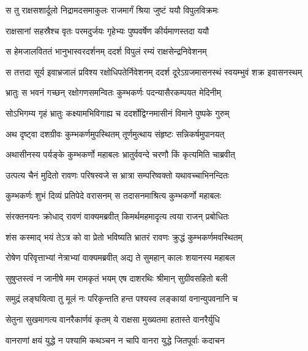 
\twolineshloka
{स तु राक्षसशार्दूलो निद्रामदसमाकुलः}
{राजमार्गं श्रिया जुष्टं ययौ विपुलविक्रमः} %

\twolineshloka
{राक्षसानां सहस्रैश्च वृतः परमदुर्जयः}
{गृहेभ्यः पुष्पवर्षेण कीर्यमाणस्तदा ययौ} %

\twolineshloka
{स हेमजालविततं भानुभास्वरदर्शनम्}
{ददर्श विपुलं रम्यं राक्षसेन्द्रनिवेशनम्} %

\twolineshloka
{स तत्तदा सूर्य इवाभ्रजालं प्रविश्य रक्षोधिपतेर्निवेशनम्}
{ददर्श दूरेऽग्रजमासनस्थं स्वयम्भुवं शक्र इवासनस्थम्} %

\twolineshloka
{भ्रातुः स भवनं गच्छन् रक्षोगणसमन्वितः}
{कुम्भकर्णः पदन्यासैरकम्पयत मेदिनीम्} %

\twolineshloka
{सोऽभिगम्य गृहं भ्रातुः कक्ष्यामभिविगाह्य च}
{ददर्शोद्विग्नमासीनं विमाने पुष्पके गुरुम्} %

\twolineshloka
{अथ दृष्ट्वा दशग्रीवः कुम्भकर्णमुपस्थितम्}
{तूर्णमुत्थाय संहृष्टः सन्निकर्षमुपानयत्} %

\twolineshloka
{अथासीनस्य पर्यङ्के कुम्भकर्णो महाबलः}
{भ्रातुर्ववन्दे चरणौ किं कृत्यमिति चाब्रवीत्} %

\twolineshloka
{उत्पत्य चैनं मुदितो रावणः परिषस्वजे}
{स भ्रात्रा सम्परिष्वक्तो यथावच्चाभिनन्दितः} %

\twolineshloka
{कुम्भकर्णः शुभं दिव्यं प्रतिपेदे वरासनम्}
{स तदासनमाश्रित्य कुम्भकर्णो महाबलः} %

\twolineshloka
{संरक्तनयनः क्रोधाद् रावणं वाक्यमब्रवीत्}
{किमर्थमहमादृत्य त्वया राजन् प्रबोधितः} %

\twolineshloka
{शंस कस्माद् भयं तेऽत्र को वा प्रेतो भविष्यति}
{भ्रातरं रावणः क्रुद्धं कुम्भकर्णमवस्थितम्} %

\twolineshloka
{रोषेण परिवृत्ताभ्यां नेत्राभ्यां वाक्यमब्रवीत्}
{अद्य ते सुमहान् कालः शयानस्य महाबल} %

\twolineshloka
{सुषुप्तस्त्वं न जानीषे मम रामकृतं भयम्}
{एष दाशरथिः श्रीमान् सुग्रीवसहितो बली} %

\twolineshloka
{समुद्रं लङ्घयित्वा तु मूलं नः परिकृन्तति}
{हन्त पश्यस्व लङ्कायां वनान्युपवनानि च} %

\twolineshloka
{सेतुना सुखमागत्य वानरैकार्णवं कृतम्}
{ये राक्षसा मुख्यतमा हतास्ते वानरैर्युधि} %

\twolineshloka
{वानराणां क्षयं युद्धे न पश्यामि कथञ्चन}
{न चापि वानरा युद्धे जितपूर्वाः कदाचन} %

